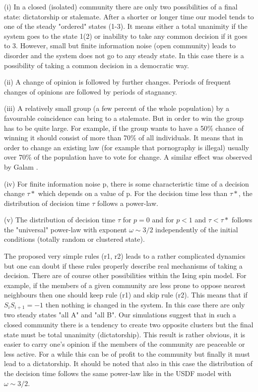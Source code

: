 (i)
In a closed (isolated) community there are only two possibilities
of a final state: dictatorship or stalemate. After a shorter or
longer time our model tends to one of the steady "ordered" states
(1-3). It means either a total unanimity if the system goes to the
state 1(2) or inability to take any common decision if it goes to
3. However, small but finite information noise (open
community) leads to disorder and the system does not go to any
steady state. In this case there is a possibility of taking a common
decision in a democratic way.

(ii)
A change of opinion is followed by further changes. 
Periods of frequent changes of opinions are followed by
periods of stagnancy.

(iii)
A relatively small group (a few percent of the whole population)
by a favourable coincidence can bring to a stalemate. 
But in order to win the group has to be quite large. For example,
if the group wants to have a 50\% chance of winning it should
consist of more than 70\% of all individuals. 
It means that in order to change an existing law 
(for example that pornography is illegal)
usually over 70\% of the population have to vote for change.
A similar effect was observed by Galam \cite{Galam}.

(iv)
For finite information noise p, there is some characteristic
time of a decision change $\tau*$ which depends on a value of p.
For the decision time less than  $\tau*$, the distribution of
decision time $\tau$ follows a power-law.

(v)
The distribution of decision time $\tau$ for $p=0$ and for 
$p<1$ and $\tau<\tau*$ follows the "universal" power-law with 
exponent $\omega \sim 3/2$ independently of the initial conditions
(totally random or clustered state).

The proposed very simple rules (r1, r2) leads to a rather complicated
dynamics but one can doubt if these rules properly describe real
mechanisms of taking a decision. There are of course other
possibilities within the Ising spin model. For example, if the
members of a given community are less prone to oppose nearest
neighbours then one should keep rule (r1) and skip rule (r2). 
This means that if $S_{i}S_{i+1}=-1$ then nothing is changed
in the system. In this case there are only two steady states "all
A" and "all B". Our simulations suggest that in such a closed
community there is a tendency to create two opposite clusters but
the final state must be total unanimity (dictatorship). This
result is rather obvious, it is easier to carry one's opinion if
the members of the community are peaceable or less active. For a
while this can be of profit to the community but finally it must
lead to a dictatorship. It should be noted that also in this case
the distribution of the decision time follows the same power-law
like in the USDF model with $\omega \sim 3/2$.


